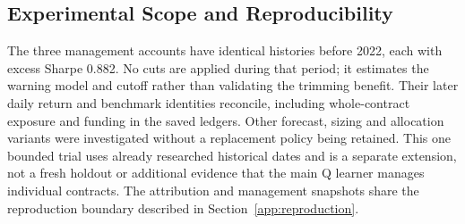 \subsection{Experimental Scope and Reproducibility}\label{app:trimming-scope}
The three management accounts have identical histories before 2022, each with excess Sharpe 0.882. No cuts are applied during that period; it estimates the warning model and cutoff rather than validating the trimming benefit. Their later daily return and benchmark identities reconcile, including whole-contract exposure and funding in the saved ledgers. Other forecast, sizing and allocation variants were investigated without a replacement policy being retained. This one bounded trial uses already researched historical dates and is a separate extension, not a fresh holdout or additional evidence that the main Q learner manages individual contracts.
The attribution and management snapshots share the reproduction boundary described in Section~\ref{app:reproduction}.
\FloatBarrier
